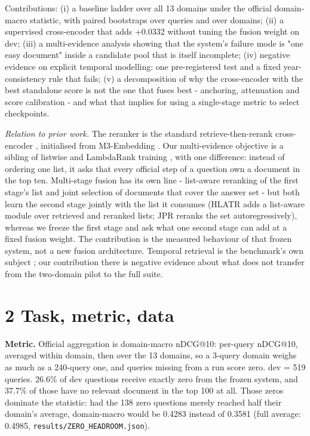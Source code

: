 \documentclass[11pt]{article}
\begin{document}
Contributions: (i) a baseline ladder over all 13 domains under the official domain-macro statistic, with paired bootstraps over queries and over domains; (ii) a supervised cross-encoder that adds +0.0332 without tuning the fusion weight on dev; (iii) a multi-evidence analysis showing that the system’s failure mode is "one easy document" inside a candidate pool that is itself incomplete; (iv) negative evidence on explicit temporal modelling: one pre-registered test and a fixed year-consistency rule that fails; (v) a decomposition of why the cross-encoder with the best standalone score is not the one that fuses best - anchoring, attenuation and score calibration - and what that implies for using a single-stage metric to select checkpoints.

\emph{Relation to prior work.} The reranker is the standard retrieve-then-rerank cross-encoder \citep{nogueira2019passage}, initialised from M3-Embedding \citep{chen2024m3}. Our multi-evidence objective is a sibling of listwise and LambdaRank training \citep{burges2010lambdarank,wang2018lambdaloss}, with one difference: instead of ordering one list, it asks that every official step of a question own a document in the top ten. Multi-stage fusion has its own line - list-aware reranking of the first stage’s list \citep{zhang2022hlatr} and joint selection of documents that cover the answer set \citep{mao2021jpr} - but both learn the second stage jointly with the list it consumes (HLATR adds a list-aware module over retrieved and reranked lists; JPR reranks the set autoregressively), whereas we freeze the first stage and ask what one second stage can add at a fixed fusion weight. The contribution is the measured behaviour of that frozen system, not a new fusion architecture. Temporal retrieval is the benchmark’s own subject \citep{abdallah2026tempo}; our contribution there is negative evidence about what does not transfer from the two-domain pilot to the full suite.

\section*{2 Task, metric, data}
\textbf{Metric.} Official aggregation is domain-macro nDCG@10: per-query nDCG@10, averaged within domain, then over the 13 domains, so a 3-query domain weighs as much as a 240-query one, and queries missing from a run score zero. dev = 519 queries. 26.6\% of dev questions receive exactly zero from the frozen system, and 37.7\% of those have no relevant document in the top 100 at all. Those zeros dominate the statistic: had the 138 zero questions merely reached half their domain’s average, domain-macro would be 0.4283 instead of 0.3581 (full average: 0.4985, \texttt{results/ZERO\_HEADROOM.json}).
\end{document}
